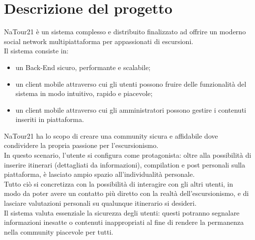 \documentclass{natourDoc}
\begin{document}

	
	
	
	
	\section{Descrizione del progetto}
	NaTour21 è un sistema complesso e distribuito finalizzato ad offrire un moderno social network multipiattaforma per appassionati di escursioni.\\
	
	Il sistema consiste in:
	\begin{itemize}
		\item un Back-End sicuro, performante e scalabile;
		\item un client mobile attraverso cui gli
		utenti possono fruire delle funzionalità del sistema in modo intuitivo, rapido e piacevole;
		\item un client mobile attraverso cui gli amministratori possono gestire i contenuti inseriti in piattaforma.\\
	\end{itemize}
	
	NaTour21 ha lo scopo di creare una community sicura e affidabile dove condividere la propria passione per l'escursionismo.\\
	
	In questo scenario, l'utente si configura come protagonista: oltre alla possibilità di inserire itinerari (dettagliati da informazioni), compilation e post personali sulla piattaforma,
	è lasciato ampio spazio all'individualità personale.\\
	
	Tutto ciò si concretizza con la possibilità di interagire con gli altri utenti, in modo da poter avere un contatto più diretto con
	la realtà dell'escursionismo, e di lasciare valutazioni personali su qualunque itinerario si desideri.\\
	
	Il sistema valuta essenziale la sicurezza degli utenti: questi potranno segnalare informazioni inesatte o contenuti inappropriati al fine 
	di rendere la permanenza nella community piacevole per tutti.
\end{document}
